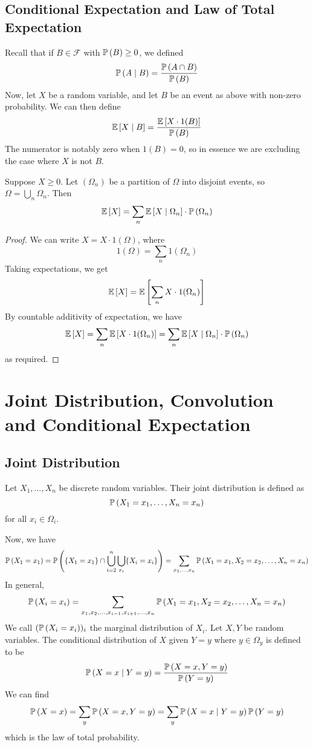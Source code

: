 \documentclass{article}
\begin{document}
\subsection{Conditional Expectation and Law of Total Expectation}
Recall that if $B \in \mathcal F$ with $\mathbb{P}\left({B}\right) \geq 0$, we defined
\[ \mathbb{P}\left({A \mid B}\right) = \frac{\mathbb{P}\left({A \cap B}\right)}{\mathbb{P}\left({B}\right)} \]
Now, let $X$ be a random variable, and let $B$ be an event as above with non-zero probability. We can then define
\[ \mathbb{E}\left[{X \mid B}\right] = \frac{\mathbb{E}\left[{X \cdot 1(B)}\right]}{\mathbb{P}\left({B}\right)} \]
The numerator is notably zero when $1(B) = 0$, so in essence we are excluding the case where $X$ is not $B$.
\begin{theorem}
	Suppose $X \geq 0$. Let $(\Omega_n)$ be a partition of $\Omega$ into disjoint events, so $\Omega = \bigcup_n \Omega_n$. Then
	\[ \mathbb{E}\left[{X}\right] = \sum_n \mathbb{E}\left[{X \mid \Omega_n}\right] \cdot \mathbb{P}\left({\Omega_n}\right) \]
\end{theorem}
\begin{proof}
	We can write $X = X \cdot 1(\Omega)$, where
	\[ 1(\Omega) = \sum_n 1(\Omega_n) \]
	Taking expectations, we get
	\[ \mathbb{E}\left[{X}\right] = \mathbb{E}\left[{ \sum_{n} X \cdot 1(\Omega_n) }\right] \]
	By countable additivity of expectation, we have
	\[ \mathbb{E}\left[{X}\right] = \sum_{n} \mathbb{E}\left[{ X \cdot 1(\Omega_n) }\right] = \sum_n \mathbb{E}\left[{X \mid \Omega_n}\right] \cdot \mathbb{P}\left({\Omega_n}\right) \]
	as required.
\end{proof}

\section{Joint Distribution, Convolution and Conditional Expectation}
\subsection{Joint Distribution}
\begin{definition}
	Let $X_1, \dots, X_n$ be discrete random variables. Their joint distribution is defined as
	\[ \mathbb{P}\left({X_1 = x_1, \dots, X_n = x_n}\right) \]
	for all $x_i \in \Omega_i$.
\end{definition}
\noindent Now, we have
\[ \mathbb{P}\left({X_1 = x_1}\right) = \mathbb{P}\left({\{ X_1 = x_1\} \cap \bigcup_{i=2}^n \bigcup_{x_i} \{ X_i = x_i \} }\right) = \sum_{x_2, \dots, x_n} \mathbb{P}\left({X_1 = x_1, X_2 = x_2, \dots, X_n = x_n}\right) \]
In general,
\[ \mathbb{P}\left({X_i = x_i}\right) = \sum_{x_1, x_2, \dots, x_{i-1}, x_{i+1}, \dots, x_n} \mathbb{P}\left({X_1 = x_1, X_2 = x_2, \dots, X_n = x_n}\right) \]
We call $(\mathbb{P}\left({X_i = x_i}\right))_i$ the marginal distribution of $X_i$. Let $X, Y$ be random variables. The conditional distribution of $X$ given $Y = y$ where $y \in \Omega_y$ is defined to be
\[ \mathbb{P}\left({X = x \mid Y = y}\right) = \frac{\mathbb{P}\left({X = x, Y = y}\right)}{\mathbb{P}\left({Y = y}\right)} \]
We can find
\[ \mathbb{P}\left({X = x}\right) = \sum_y \mathbb{P}\left({X = x, Y = y}\right) = \sum_y \mathbb{P}\left({X = x \mid Y = y}\right) \mathbb{P}\left({Y = y}\right) \]
which is the law of total probability.
\end{document}
